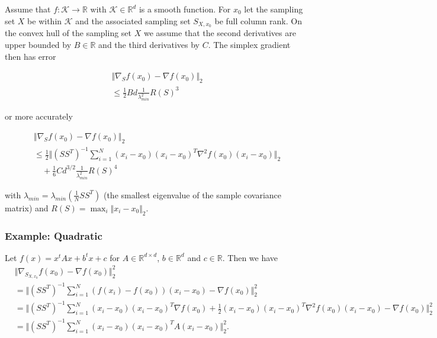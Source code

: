 \begin{lemma}
Assume that $f : \mathcal{K} \rightarrow \mathbb{R}$ with $\mathcal{K} \in \mathbb{R}^d$ is a smooth function. For $x_0$ let the sampling set $X$ be within $\mathcal{K}$ and the associated sampling set $S_{X, x_0}$ be full column rank. On the convex hull of the sampling set $X$ we assume that the second derivatives are upper bounded by $B \in \mathbb{R}$ and the third derivatives by $C$. The simplex gradient then has error 

\begin{align}
    &\Vert\nabla_S f(x_0)  - \nabla f(x_0) \Vert_2 \\
    &\leq \frac{1}{2} B d \frac{1}{\lambda_{min}^2} R(S)^{3}
\end{align}

or more accurately

\begin{align}
    &\Vert\nabla_S f(x_0)  - \nabla f(x_0) \Vert_2 \\
    &\leq \frac{1}{2} \Vert (SS^T)^{-1} \sum_{i = 1}^N (x_i - x_0) (x_i - x_0)^T \nabla^2 f(x_0) (x_i - x_0) \Vert_2 \\
    &\quad + \frac{1}{6} C d^{3/2} \frac{1}{\lambda_{min}^2} R(S)^{4}
\end{align}

with $\lambda_{min} = \lambda_{min}(\frac{1}{N} SS^T)$ (the smallest eigenvalue of the sample covariance matrix) and $R(S) = \max_{i} \Vert x_i - x_0 \Vert_2$. 

\end{lemma}



\subsubsection{Example: Quadratic}
\begin{exmp}
Let $f(x) = x^t A x + b^t x + c$ for $A \in \mathbb{R}^{d \times d}$, $b \in \mathbb{R}^d$ and $c \in \mathbb{R}$. Then we have
\begin{align}
    &\Vert \nabla_{S_{X, x_0}} f(x_0) - \nabla f(x_0) \Vert_2^2 \\
    &= \Vert (SS^T)^{-1} \sum_{i = 1}^N (f(x_i) - f(x_0)) (x_i - x_0) - \nabla f(x_0) \Vert_2^2 \\
    &= \Vert (SS^T)^{-1} \sum_{i = 1}^N (x_i - x_0) (x_i - x_0)^T \nabla f(x_0) + \frac{1}{2} (x_i - x_0) (x_i - x_0)^T \nabla^2 f(x_0) (x_i - x_0) - \nabla f(x_0) \Vert_2^2 \\
    &= \Vert (SS^T)^{-1} \sum_{i = 1}^N (x_i - x_0) (x_i - x_0)^T A (x_i - x_0) \Vert_2^2.
\end{align}



\end{exmp}

